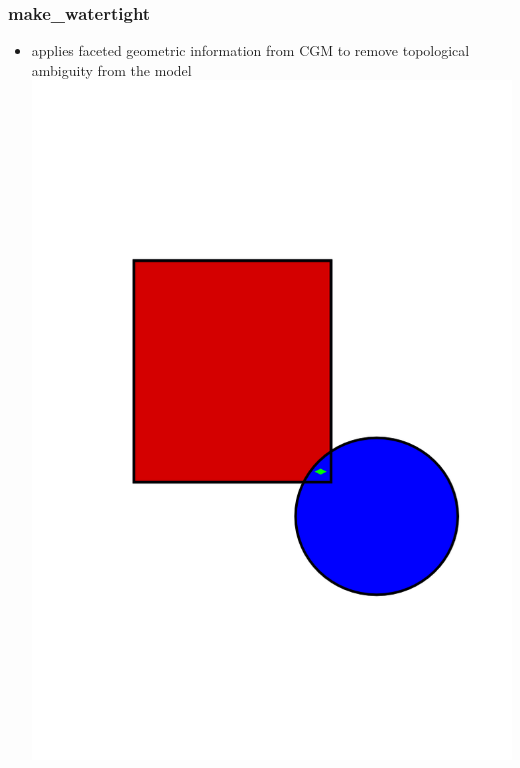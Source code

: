 \documentclass[14pt]{beamer}
\begin{document}
\begin{frame}
\end{frame}


\begin{frame}
\frametitle{make\_watertight}
\begin{itemize}
\item applies faceted geometric information from CGM to remove topological ambiguity from the model
\includegraphics[scale=0.4, trim = 0 0 100 150]{VolOverlap.png}
\end{itemize}
\end{frame}
\end{document}
